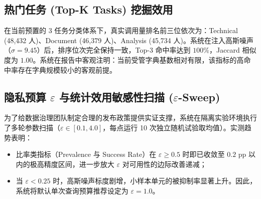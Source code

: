 \subsection{热门任务 (Top-K Tasks) 挖掘效用}
在当前预置的 3 任务分类体系下，真实调用量排名前三位依次为：Technical (48,432 人)、Document (46,379 人)、Analysis (45,734 人)。系统在注入高斯噪声（$\sigma = 9.45$）后，排序位次完全保持一致，Top-3 命中率达到 $100\%$，Jaccard 相似度为 $1.00$。系统在报告中客观注明：当前受管字典基数相对有限，该指标的高命中率存在字典规模较小的客观前提。

\subsection{隐私预算 \texorpdfstring{$\varepsilon$}{Epsilon} 与统计效用敏感性扫描 (\texorpdfstring{$\varepsilon$}{Epsilon}-Sweep)}
为了给数据治理团队制定合理的发布政策提供实证支撑，系统在隔离实验环境执行了多轮参数扫描（$\varepsilon \in [0.1, 4.0]$，每点运行 10 次独立随机试验取均值）。实测趋势表明：
\begin{itemize}[leftmargin=2em]
  \item 比率类指标（Prevalence 与 Success Rate）在 $\varepsilon \ge 0.5$ 时即已收敛至 $0.2\text{ pp}$ 以内的极高精度区间，进一步放大 $\varepsilon$ 对可用性的边际改善递减；
  \item 当 $\varepsilon < 0.25$ 时，高斯噪声标度剧增，小样本单元的被抑制率显著上升。因此，系统将默认单次查询预算推荐设定为 $\varepsilon = 1.0$。
\end{itemize}

